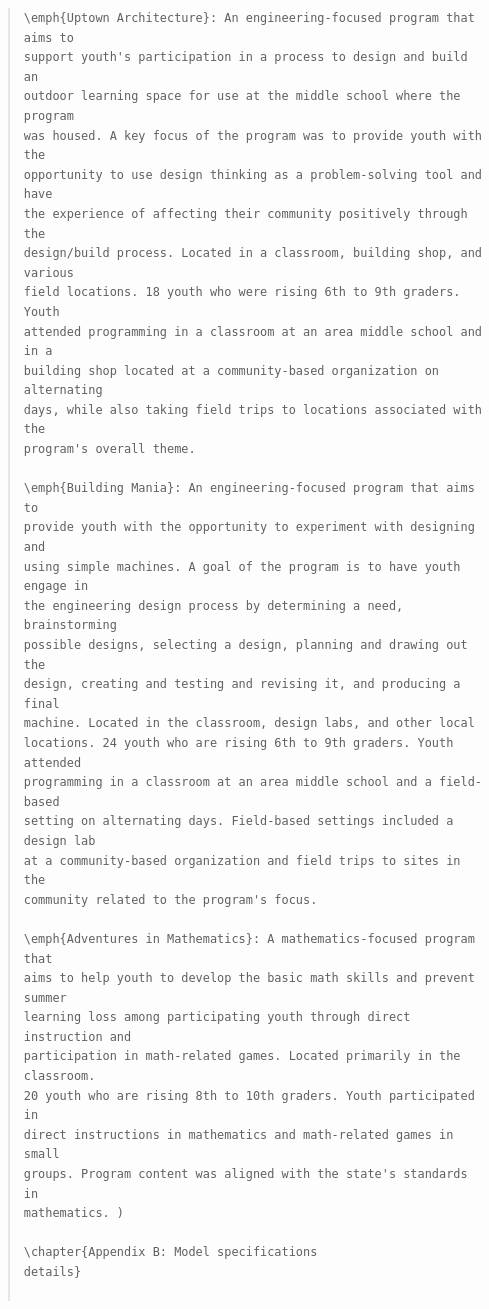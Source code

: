 \documentclass[]{msu-thesis}
\theoremstyle{definition}
\theoremstyle{definition}
\theoremstyle{definition}
\theoremstyle{remark}
\begin{document}
\begin{quote}
\begin{lstlisting}
\emph{Uptown Architecture}: An engineering-focused program that aims to
support youth's participation in a process to design and build an
outdoor learning space for use at the middle school where the program
was housed. A key focus of the program was to provide youth with the
opportunity to use design thinking as a problem-solving tool and have
the experience of affecting their community positively through the
design/build process. Located in a classroom, building shop, and various
field locations. 18 youth who were rising 6th to 9th graders. Youth
attended programming in a classroom at an area middle school and in a
building shop located at a community-based organization on alternating
days, while also taking field trips to locations associated with the
program's overall theme.

\emph{Building Mania}: An engineering-focused program that aims to
provide youth with the opportunity to experiment with designing and
using simple machines. A goal of the program is to have youth engage in
the engineering design process by determining a need, brainstorming
possible designs, selecting a design, planning and drawing out the
design, creating and testing and revising it, and producing a final
machine. Located in the classroom, design labs, and other local
locations. 24 youth who are rising 6th to 9th graders. Youth attended
programming in a classroom at an area middle school and a field-based
setting on alternating days. Field-based settings included a design lab
at a community-based organization and field trips to sites in the
community related to the program's focus.

\emph{Adventures in Mathematics}: A mathematics-focused program that
aims to help youth to develop the basic math skills and prevent summer
learning loss among participating youth through direct instruction and
participation in math-related games. Located primarily in the classroom.
20 youth who are rising 8th to 10th graders. Youth participated in
direct instructions in mathematics and math-related games in small
groups. Program content was aligned with the state's standards in
mathematics. )

\chapter{Appendix B: Model specifications
details}


\end{lstlisting}
\end{quote}
\end{document}
